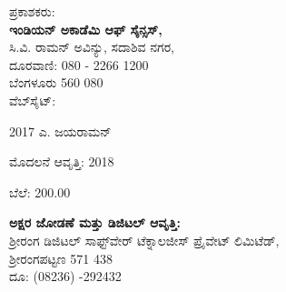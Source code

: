 

\begin{flushleft}
ಪ್ರಕಾಶಕರು:\\\textbf{ಇಂಡಿಯನ್ ಅಕಾಡೆಮಿ ಆಫ್ ಸೈನ್ಸಸ್,}\\
 ಸಿ.ವಿ. ರಾಮನ್ ಅವಿನ್ಯು, ಸದಾಶಿವ ನಗರ,\\
 ದೂರವಾಣಿ: 080 - 2266 1200\\
 ಬೆಂಗಳೂರು 560 080\\
 ವೆಬ್‍ಸೈಟ್: 
\end{flushleft}

\vfill

\noindent {} 2017 ಎ. ಜಯರಾಮನ್

\noindent ಮೊದಲನೆ ಆವೃತ್ತಿ: 2018

\noindent ಬೆಲೆ: 200.00

\vfill

\begin{flushleft}
 \textbf{ಅಕ್ಷರ ಜೋಡಣೆ ಮತ್ತು ಡಿಜಿಟಲ್ ಆವೃತ್ತಿ:}\\
 ಶ‍್ರೀರಂಗ ಡಿಜಿಟಲ್ ಸಾಫ್ಟ್‌ವೇರ್ ಟೆಕ್ನಾಲಜೀಸ್ ಪ್ರೈವೇಟ್ ಲಿಮಿಟೆಡ್,\\
 ಶ‍್ರೀರಂಗಪಟ್ಟಣ 571 438\\ 
 ದೂ: (08236) -292432
\end{flushleft}


